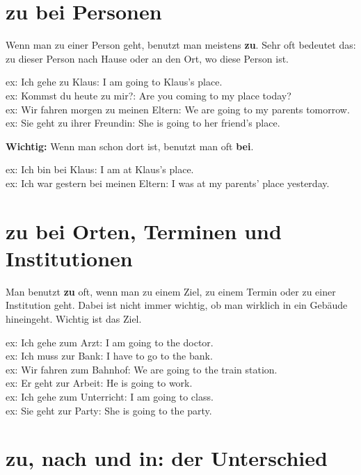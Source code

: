 \documentclass[a4paper,12pt]{article}
\begin{document}
    
    \section{zu bei Personen}
        
        Wenn man zu einer Person geht, benutzt man meistens \textbf{zu}. Sehr oft bedeutet das: zu dieser Person nach Hause oder an den Ort, wo diese Person ist.
        
        ex: Ich gehe zu Klaus: I am going to Klaus's place.\\
        ex: Kommst du heute zu mir?: Are you coming to my place today?\\
        ex: Wir fahren morgen zu meinen Eltern: We are going to my parents tomorrow.\\
        ex: Sie geht zu ihrer Freundin: She is going to her friend's place.
        
        \textbf{Wichtig:} Wenn man schon dort ist, benutzt man oft \textbf{bei}.
        
        ex: Ich bin bei Klaus: I am at Klaus's place.\\
        ex: Ich war gestern bei meinen Eltern: I was at my parents' place yesterday.
    
    
    \section{zu bei Orten, Terminen und Institutionen}
        
        Man benutzt \textbf{zu} oft, wenn man zu einem Ziel, zu einem Termin oder zu einer Institution geht. Dabei ist nicht immer wichtig, ob man wirklich in ein Gebäude hineingeht. Wichtig ist das Ziel.
        
        ex: Ich gehe zum Arzt: I am going to the doctor.\\
        ex: Ich muss zur Bank: I have to go to the bank.\\
        ex: Wir fahren zum Bahnhof: We are going to the train station.\\
        ex: Er geht zur Arbeit: He is going to work.\\
        ex: Ich gehe zum Unterricht: I am going to class.\\
        ex: Sie geht zur Party: She is going to the party.
    
    
    \section{zu, nach und in: der Unterschied}
        
\end{document}
